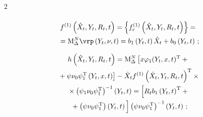 \begin{multicols}{2}
\begin{multline*}
    \end{multline*}



    \vspace*{-12pt}



    \noindent

    \begin{multline*}

   f^{(1)}\left(\hat X_t, Y_t,R_t,t\right)=\left\{ f_r^{(1)} \left( \hat X_t, Y_t, R_t, t\right)\right\}={}\\

   {}=\mathrm{M}^N_\Delta \vrp \left(Y_t, \nu,t\right)=b_1 \left(Y_t, t\right) \hat{X}_t+ b_0 \left(Y_t, t\right)\,;


   \end{multline*}



\vspace*{-12pt}



\noindent

   \begin{multline*}

    h\left(\hat X_t, Y_t,R_t,t\right)=\mathrm{M}^N_\Delta \left[ x\varphi_1(Y_t,x,t)^{\mathrm{T}} + {}\right.\\

\left.    {}+\psi\nu_0\psi_1^{\mathrm{T}} \left(Y_t,x,t\right)\right]-

    \hat{X}_t f^{(1)}\left(\hat X_t, Y_t,R_t,t\right)^{\mathrm{T}} %

    \times{}\\

{}\times \left(\psi_1\nu_0\psi_1^{\mathrm{T}}\right)^{-1} \left(Y_t,t\right)=

\left[ R_t b_1 \left(Y_t, t\right)^{\mathrm{T}} + {}\right.\\

\left.{}+\left(\psi\nu_0\psi_1^{\mathrm{T}}\right)\left(Y_t, t\right)

\vphantom{\left(Y_t, t\right)^{\mathrm{T}}}

\right] \left(\psi\nu_0\psi_1^{\mathrm{T}}\right)^{-1} \left(Y_t, t\right)\,;


\end{multline*}



\vspace*{-12pt}




\end{multicols}
